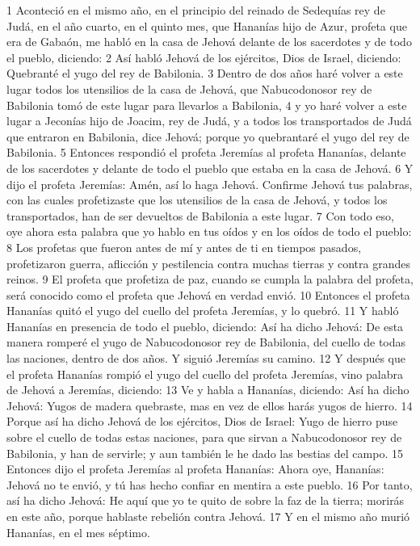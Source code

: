 1 Aconteció en el mismo año, en el principio del reinado de Sedequías rey de Judá, en el año cuarto, en el quinto mes, que Hananías hijo de Azur, profeta que era de Gabaón, me habló en la casa de Jehová delante de los sacerdotes y de todo el pueblo, diciendo:
2 Así habló Jehová de los ejércitos, Dios de Israel, diciendo: Quebranté el yugo del rey de Babilonia.
3 Dentro de dos años haré volver a este lugar todos los utensilios de la casa de Jehová, que Nabucodonosor rey de Babilonia tomó de este lugar para llevarlos a Babilonia,
4 y yo haré volver a este lugar a Jeconías hijo de Joacim, rey de Judá, y a todos los transportados de Judá que entraron en Babilonia, dice Jehová; porque yo quebrantaré el yugo del rey de Babilonia.
5 Entonces respondió el profeta Jeremías al profeta Hananías, delante de los sacerdotes y delante de todo el pueblo que estaba en la casa de Jehová.
6 Y dijo el profeta Jeremías: Amén, así lo haga Jehová. Confirme Jehová tus palabras, con las cuales profetizaste que los utensilios de la casa de Jehová, y todos los transportados, han de ser devueltos de Babilonia a este lugar.
7 Con todo eso, oye ahora esta palabra que yo hablo en tus oídos y en los oídos de todo el pueblo: 
8 Los profetas que fueron antes de mí y antes de ti en tiempos pasados, profetizaron guerra, aflicción y pestilencia contra muchas tierras y contra grandes reinos.
9 El profeta que profetiza de paz, cuando se cumpla la palabra del profeta, será conocido como el profeta que Jehová en verdad envió.
10 Entonces el profeta Hananías quitó el yugo del cuello del profeta Jeremías, y lo quebró.
11 Y habló Hananías en presencia de todo el pueblo, diciendo: Así ha dicho Jehová: De esta manera romperé el yugo de Nabucodonosor rey de Babilonia, del cuello de todas las naciones, dentro de dos años. Y siguió Jeremías su camino.
12 Y después que el profeta Hananías rompió el yugo del cuello del profeta Jeremías, vino palabra de Jehová a Jeremías, diciendo:
13 Ve y habla a Hananías, diciendo: Así ha dicho Jehová: Yugos de madera quebraste, mas en vez de ellos harás yugos de hierro.
14 Porque así ha dicho Jehová de los ejércitos, Dios de Israel: Yugo de hierro puse sobre el cuello de todas estas naciones, para que sirvan a Nabucodonosor rey de Babilonia, y han de servirle; y aun también le he dado las bestias del campo.
15 Entonces dijo el profeta Jeremías al profeta Hananías: Ahora oye, Hananías: Jehová no te envió, y tú has hecho confiar en mentira a este pueblo.
16 Por tanto, así ha dicho Jehová: He aquí que yo te quito de sobre la faz de la tierra; morirás en este año, porque hablaste rebelión contra Jehová.
17 Y en el mismo año murió Hananías, en el mes séptimo.

